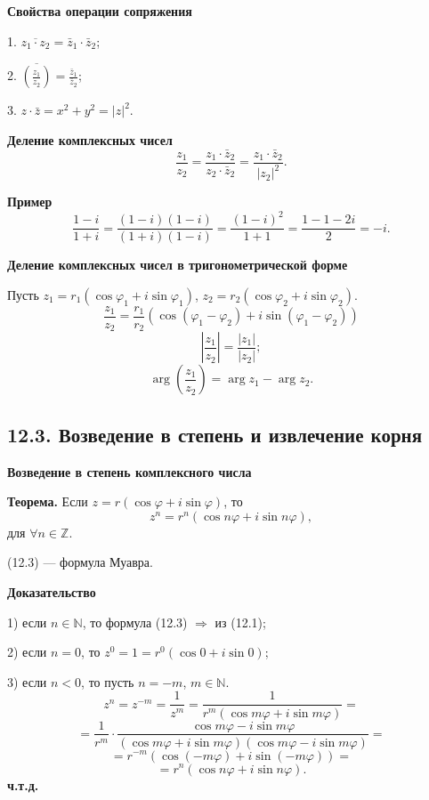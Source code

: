 \documentclass[12pt,a4paper]{article}
\begin{document}
\textbf{Свойства операции сопряжения}

1. $\overline{z_1\cdot z_2}=\bar z_1\cdot \bar z_2$;

2. $\overline{\left(\frac{z_1}{z_2}\right)}=\frac{\bar z_1}{\bar z_2}$;

3. $z\cdot \bar z=x^2+y^2=|z|^2$.

\textbf{Деление комплексных чисел}
$$
\frac{z_1}{z_2}=\frac{z_1\cdot \bar z_2}{z_2\cdot \bar
z_2}=\frac{z_1\cdot \bar z_2}{|z_2|^2}.
$$

\textbf{Пример}
$$
\frac{1-i}{1+i}=\frac{(1-i)(1-i)}{(1+i)(1-i)}=\frac{(1-i)^2}{1+1}=\frac{1-1-2i}{2}=-i.
$$

\textbf{Деление комплексных чисел в тригонометрической форме}

Пусть $z_1=r_1(\cos\varphi_1+i\sin\varphi_1)$,
$z_2=r_2(\cos\varphi_2+i\sin\varphi_2)$.
\begin{equation}
  \frac{z_1}{z_2}=\frac{r_1}{r_2}\left(\cos(\varphi_1-\varphi_2)+i\sin(\varphi_1-\varphi_2)\right)
  \tag{12.2}
\end{equation}
$$
\left|\frac{z_1}{z_2}\right|=\frac{|z_1|}{|z_2|};
$$
$$
\arg\left(\frac{z_1}{z_2}\right)=\arg z_1-\arg z_2.
$$

\subsection*{\textbf{12.3. Возведение в степень и извлечение корня}}

\textbf{Возведение в степень комплексного числа}

\textbf{Теорема.} Если $z=r(\cos\varphi+i\sin\varphi)$, то
\begin{equation}
  z^n=r^n(\cos n\varphi+i\sin n\varphi), \tag{12.3}
\end{equation}
для $\forall n\in\mathbb Z$.

(12.3) --- формула Муавра.

\textbf{Доказательство}

1) если $n\in\mathbb N$, то формула (12.3) $\Rightarrow$ из (12.1);

2) если $n=0$, то $z^0=1=r^0(\cos0+i\sin0)$;

3) если $n<0$, то пусть $n=-m$, $m\in\mathbb N$.
$$
z^n=z^{-m}=\frac{1}{z^m}=\frac{1}{r^m(\cos m\varphi+i\sin m\varphi)}=
$$
$$
=\frac{1}{r^m}\cdot
\frac{\cos m\varphi-i\sin m\varphi}{(\cos m\varphi+i\sin
m\varphi)(\cos m\varphi-i\sin m\varphi)}=
$$
$$
=r^{-m}(\cos(-m\varphi)+i\sin(-m\varphi))=
$$
$$
=r^n(\cos n\varphi+i\sin n\varphi).
$$
\textbf{ч.т.д.}
\end{document}

